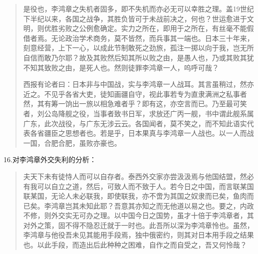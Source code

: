 \begin{quotation}
是役也，李鸿章之失机者固多，即不失机而亦必无可以幸胜之理。盖19世纪下半纪以来，各国之战争，其胜负皆可于未战前决之，何也？世运愈进于文明，则优胜劣败之公例愈确定。实力之所在，即用于之所在，有丝毫不能假借者焉。无论政治学术商务，莫不皆然，而兵事其一端也。日本三十年来，刻意经营，上下一心，以成此节制敢死之劲旅，孤注一掷以向于我，岂无所自信而敢乃尔耶？故及其败然后知其所以败之由，是愚人也，乃或其败其犹不知其致败之由，是死人也。然则徒罪李鸿章一人，呜呼可哉？

西报有论者曰：日本非与中国战，实与李鸿章一人战耳。其言虽稍过，然亦近之。不见乎各省大吏，徒知画疆自守，视此事若专为直隶满洲之私事者然，其有筹一饷出一旅以相急难者乎？即有这，亦空言而已。乃至最可笑者，刘公岛降舰之役，当事者致书日军，求放还广丙一舰，书中谓此舰系属广东，此次战役，与广东无涉云云。各国闻者，莫不笑之，而不知此语实代表各省疆臣之思想者也。若是乎，日本果真与李鸿章一人战也。以一人而战一国，合肥合肥，虽败亦豪也。
\end{quotation}



16.对李鸿章外交失利的分析：
\begin{quotation}
夫天下未有徒恃人而可以自存者。泰西外交家亦尝汲汲焉与他国结盟，然必有我可以自立之道，然后，可致人而不致于人。若今日之中国，而言联某国联某国，无论人未必联我，即使联我，亦不啻为其国之奴隶而已矣，鱼肉而已矣。李鸿章岂其未知此耶？吾意其亦知之而无他道以易之也。要之，内政不修，则外交实无可办之理。以中国今日之国势，虽才十倍于李鸿章者，其对外之策，固不得不隐忍迁就于一时也。此吾所以深为李鸿章怜也。虽然，李鸿章与他役吾未见其能用手段焉，独中俄密约，则其对日本用手段之结果也。以此手段，而造出后此种种之困难，自作之而自受之，吾又何怜哉？
\end{quotation}

